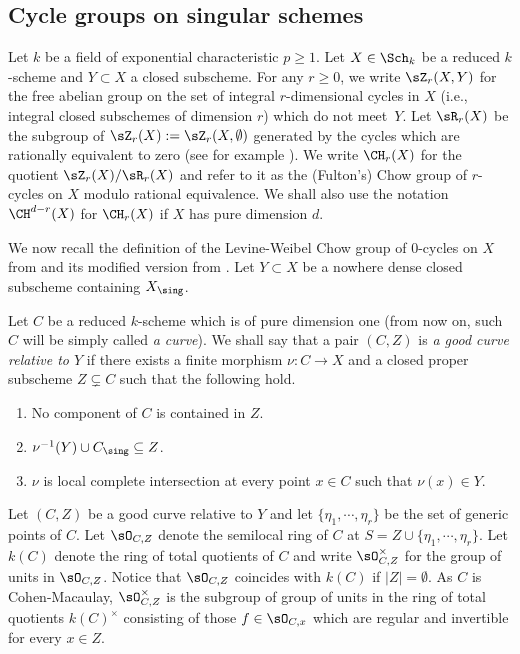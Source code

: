 \subsection{Cycle groups on singular schemes}\label{ssec:$0$-cycles-singschemes}
Let $k$ be a field of exponential characteristic $p \ge 1$. Let $X\in \Sch_k$ be a reduced $k$-scheme and $Y \subset X$ a closed subscheme. For any $r\geq 0$, we write
$\sZ_r(X,Y)$ for the free abelian group on the set of integral $r$\nobreakdash-dimen\-sional cycles in $X$ (i.e., integral closed subschemes of dimension $r$) which do not meet~$Y$.
Let $\sR_r(X)$ be the subgroup of $\sZ_r(X) := \sZ_r(X, \emptyset)$ generated by the cycles which are rationally equivalent to zero (see for example \cite[\S 1]{Fulton}). We write $\CH_r(X)$ for the quotient $\sZ_r(X)/\sR_r(X)$ and refer to it as the (Fulton's) Chow group of $r$-cycles on $X$ modulo rational equivalence.
We shall also use the notation $\CH^{d-r}(X)$ for $\CH_r(X)$ if $X$ has pure
dimension $d$.

We now recall the definition of the Levine-Weibel Chow group of $0$-cycles on $X$ from
\cite{LW} and its modified version from \cite{BK}.
Let $Y \subset X$ be a nowhere dense closed subscheme containing $X_\sing$.

\begin{defn}\label{defn:$0$-cycle-S-1}
Let $C$ be a reduced $k$-scheme which is of pure dimension one (from now on, such $C$ will be simply called \emph{a curve}).
We shall say that a pair $(C, Z)$ is \emph{a good curve
relative to $Y$} if there exists a finite morphism $\nu\colon C \to X$
and a closed proper subscheme $Z \subsetneq C$ such that the following hold.
\begin{enumerate}
\item
No component of $C$ is contained in $Z$.
\item
$\nu^{-1}(Y) \cup C_{\sing}\subseteq Z$.
\item
$\nu$ is local complete intersection at every
point $x \in C$ such that $\nu(x) \in Y$.
\end{enumerate}
\end{defn}

Let $(C, Z)$ be a good curve relative to $Y$ and let
$\{\eta_1, \cdots , \eta_r\}$ be the set of generic points of $C$.
Let $\sO_{C,Z}$ denote the semilocal ring of $C$ at
$S = Z \cup \{\eta_1, \cdots , \eta_r\}$.
Let $k(C)$ denote the ring of total
quotients of $C$ and write $\sO_{C,Z}^\times$ for the group of units in
$\sO_{C,Z}$. Notice that $\sO_{C,Z}$ coincides with $k(C)$
if $|Z| = \emptyset$.
As $C$ is Cohen-Macaulay, $\sO_{C,Z}^\times$ is the subgroup of group of units
in the ring of total quotients $k(C)^\times$
consisting of those $f\in \sO_{C,x}$ which are regular and invertible for
every $x\in Z$.

